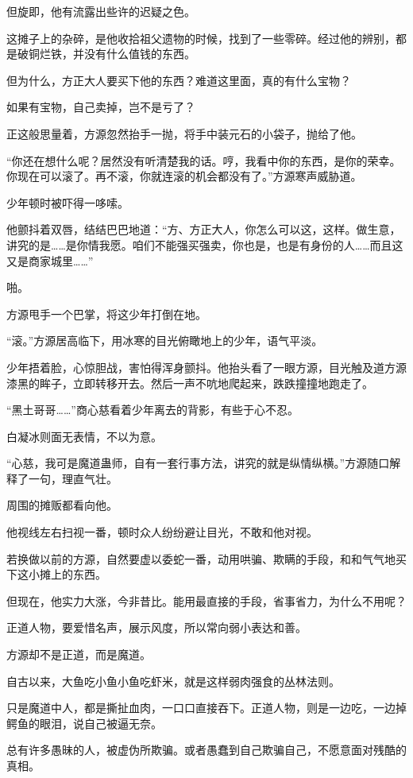 \begin{this_body}
但旋即，他有流露出些许的迟疑之色。

这摊子上的杂碎，是他收拾祖父遗物的时候，找到了一些零碎。经过他的辨别，都是破铜烂铁，并没有什么值钱的东西。

但为什么，方正大人要买下他的东西？难道这里面，真的有什么宝物？

如果有宝物，自己卖掉，岂不是亏了？

正这般思量着，方源忽然抬手一抛，将手中装元石的小袋子，抛给了他。

“你还在想什么呢？居然没有听清楚我的话。哼，我看中你的东西，是你的荣幸。你现在可以滚了。再不滚，你就连滚的机会都没有了。”方源寒声威胁道。

少年顿时被吓得一哆嗦。

他颤抖着双唇，结结巴巴地道：“方、方正大人，你怎么可以这，这样。做生意，讲究的是……是你情我愿。咱们不能强买强卖，你也是，也是有身份的人……而且这又是商家城里……”

啪。

方源甩手一个巴掌，将这少年打倒在地。

“滚。”方源居高临下，用冰寒的目光俯瞰地上的少年，语气平淡。

少年捂着脸，心惊胆战，害怕得浑身颤抖。他抬头看了一眼方源，目光触及道方源漆黑的眸子，立即转移开去。然后一声不吭地爬起来，跌跌撞撞地跑走了。

“黑土哥哥……”商心慈看着少年离去的背影，有些于心不忍。

白凝冰则面无表情，不以为意。

“心慈，我可是魔道蛊师，自有一套行事方法，讲究的就是纵情纵横。”方源随口解释了一句，理直气壮。

周围的摊贩都看向他。

他视线左右扫视一番，顿时众人纷纷避让目光，不敢和他对视。

若换做以前的方源，自然要虚以委蛇一番，动用哄骗、欺瞒的手段，和和气气地买下这小摊上的东西。

但现在，他实力大涨，今非昔比。能用最直接的手段，省事省力，为什么不用呢？

正道人物，要爱惜名声，展示风度，所以常向弱小表达和善。

方源却不是正道，而是魔道。

自古以来，大鱼吃小鱼小鱼吃虾米，就是这样弱肉强食的丛林法则。

只是魔道中人，都是撕扯血肉，一口口直接吞下。正道人物，则是一边吃，一边掉鳄鱼的眼泪，说自己被逼无奈。

总有许多愚昧的人，被虚伪所欺骗。或者愚蠢到自己欺骗自己，不愿意面对残酷的真相。


\end{this_body}
